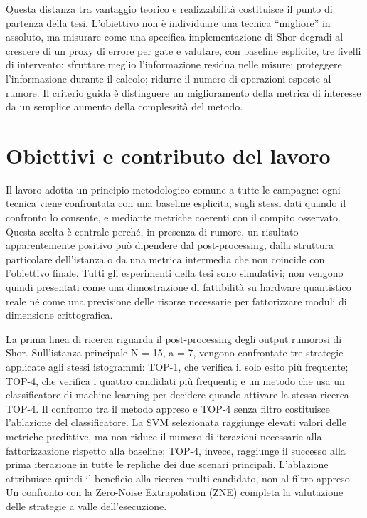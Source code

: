 Questa distanza tra vantaggio teorico e realizzabilità costituisce il punto di partenza della tesi. L'obiettivo non è individuare una tecnica ``migliore'' in assoluto, ma misurare come una specifica implementazione di Shor degradi al crescere di un proxy di errore per gate e valutare, con baseline esplicite, tre livelli di intervento: sfruttare meglio l'informazione residua nelle misure; proteggere l'informazione durante il calcolo; ridurre il numero di operazioni esposte al rumore. Il criterio guida è distinguere un miglioramento della metrica di interesse da un semplice aumento della complessità del metodo.

\section{Obiettivi e contributo del lavoro}\label{sec:finale_1_2}

Il lavoro adotta un principio metodologico comune a tutte le campagne: ogni tecnica viene confrontata con una baseline esplicita, sugli stessi dati quando il confronto lo consente, e mediante metriche coerenti con il compito osservato. Questa scelta è centrale perché, in presenza di rumore, un risultato apparentemente positivo può dipendere dal post-processing, dalla struttura particolare dell'istanza o da una metrica intermedia che non coincide con l'obiettivo finale. Tutti gli esperimenti della tesi sono simulativi; non vengono quindi presentati come una dimostrazione di fattibilità su hardware quantistico reale né come una previsione delle risorse necessarie per fattorizzare moduli di dimensione crittografica.

La prima linea di ricerca riguarda il post-processing degli output rumorosi di Shor. Sull'istanza principale N = 15, a = 7, vengono confrontate tre strategie applicate agli stessi istogrammi: TOP-1, che verifica il solo esito più frequente; TOP-4, che verifica i quattro candidati più frequenti; e un metodo che usa un classificatore di machine learning per decidere quando attivare la stessa ricerca TOP-4. Il confronto tra il metodo appreso e TOP-4 senza filtro costituisce l'ablazione del classificatore. La SVM selezionata raggiunge elevati valori delle metriche predittive, ma non riduce il numero di iterazioni necessarie alla fattorizzazione rispetto alla baseline; TOP-4, invece, raggiunge il successo alla prima iterazione in tutte le repliche dei due scenari principali. L'ablazione attribuisce quindi il beneficio alla ricerca multi-candidato, non al filtro appreso. Un confronto con la Zero-Noise Extrapolation (ZNE) completa la valutazione delle strategie a valle dell'esecuzione.


